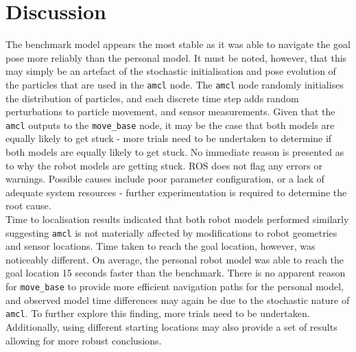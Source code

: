 \documentclass[a4paper]{article}
\begin{document}
\section{Discussion}
The benchmark model appears the most stable as it was able to navigate the goal pose more reliably than the personal model. It must be noted, however, that this may simply be an artefact of the stochastic initialisation and pose evolution of the particles that are used in the \texttt{amcl} node. The \texttt{amcl} node randomly initialises the distribution of particles, and each discrete time step adds random perturbations to particle movement, and sensor measurements. Given that the \texttt{amcl} outputs to the \texttt{move\_base} node, it may be the case that both models are equally likely to get stuck - more trials need to be undertaken to determine if both models are equally likely to get stuck. No immediate reason is presented as to why the robot models are getting stuck. ROS does not flag any errors or warnings. Possible causes include poor parameter configuration, or a lack of adequate system resources - further experimentation is required to determine the root cause.\\

Time to localisation results indicated that both robot models performed similarly suggesting \texttt{amcl} is not materially affected by modifications to robot geometries and sensor locations. Time taken to reach the goal location, however, was noticeably different. On average, the personal robot model was able to reach the goal location 15 seconds faster than the benchmark. There is no apparent reason for \texttt{move\_base} to provide more efficient navigation paths for the personal model, and observed model time differences may again be due to the stochastic nature of \texttt{amcl}. To further explore this finding, more trials need to be undertaken. Additionally, using different starting locations may also provide a set of results allowing for more robust conclusions.

\newpage
\end{document}

